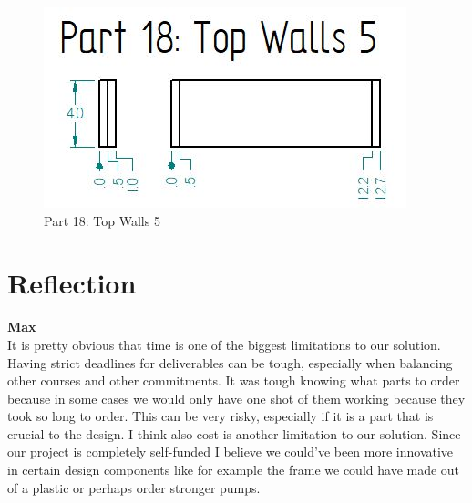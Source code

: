 \documentclass[12pt, titlepage]{article}
\begin{document}
\begin{figure}[H]
    \centerline{\includegraphics[scale=.5]{Part 18.jpg}}
    \caption{Part 18: Top Walls 5}
    \label{fig}
\end{figure}

\section{Reflection}



\textbf{Max}\\
It is pretty obvious that time is one of the biggest limitations to our solution. Having strict deadlines for deliverables can be tough, especially when balancing other courses and other commitments. It was tough knowing what parts to order because in some cases we would only have one shot of them working because they took so long to order. This can be very risky, especially if it is a part that is crucial to the design. I think also cost is another limitation to our solution. Since our project is completely self-funded I believe we could've been more innovative in certain design components like for example the frame we could have made out of a plastic or perhaps order stronger pumps. \\
\end{document}
